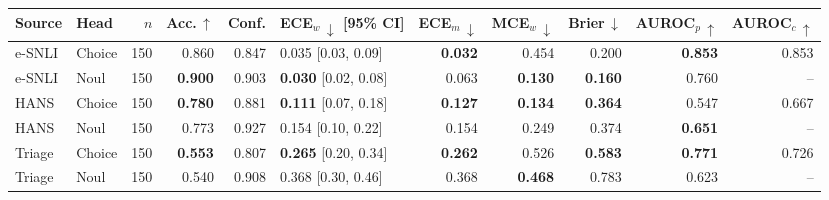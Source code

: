\begin{tabular}{llrrrlrrrrr}
\toprule
Source & Head & $n$ & Acc.\,$\uparrow$ & Conf. & ECE$_{w}\,\downarrow$ [95\% CI] & ECE$_{m}\,\downarrow$ & MCE$_{w}\,\downarrow$ & Brier\,$\downarrow$ & AUROC$_{p}\,\uparrow$ & AUROC$_{c}\,\uparrow$ \\
\midrule
e-SNLI & Choice & 150 & 0.860 & 0.847 & 0.035 [0.03, 0.09] & \textbf{0.032} & 0.454 & 0.200 & \textbf{0.853} & 0.853 \\
e-SNLI & Noul & 150 & \textbf{0.900} & 0.903 & \textbf{0.030} [0.02, 0.08] & 0.063 & \textbf{0.130} & \textbf{0.160} & 0.760 & -- \\
\midrule
HANS & Choice & 150 & \textbf{0.780} & 0.881 & \textbf{0.111} [0.07, 0.18] & \textbf{0.127} & \textbf{0.134} & \textbf{0.364} & 0.547 & 0.667 \\
HANS & Noul & 150 & 0.773 & 0.927 & 0.154 [0.10, 0.22] & 0.154 & 0.249 & 0.374 & \textbf{0.651} & -- \\
\midrule
Triage & Choice & 150 & \textbf{0.553} & 0.807 & \textbf{0.265} [0.20, 0.34] & \textbf{0.262} & 0.526 & \textbf{0.583} & \textbf{0.771} & 0.726 \\
Triage & Noul & 150 & 0.540 & 0.908 & 0.368 [0.30, 0.46] & 0.368 & \textbf{0.468} & 0.783 & 0.623 & -- \\
\bottomrule
\end{tabular}
